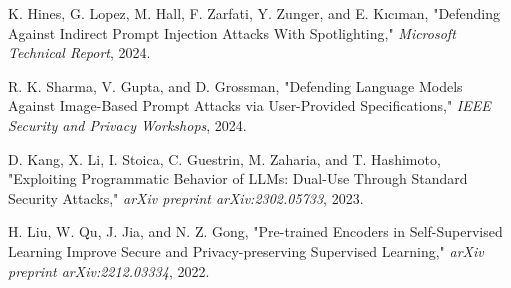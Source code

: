 \documentclass[journal]{IEEEtran}  %
\begin{document}
\begin{thebibliography}{4}

 K. Hines, G. Lopez, M. Hall, F. Zarfati, Y. Zunger, and E. Kıcıman, "Defending Against Indirect Prompt Injection Attacks With Spotlighting," \emph{Microsoft Technical Report}, 2024.

 R. K. Sharma, V. Gupta, and D. Grossman, "Defending Language Models Against Image-Based Prompt Attacks via User-Provided Specifications," \emph{IEEE Security and Privacy Workshops}, 2024.

 D. Kang, X. Li, I. Stoica, C. Guestrin, M. Zaharia, and T. Hashimoto, "Exploiting Programmatic Behavior of LLMs: Dual-Use Through Standard Security Attacks," \emph{arXiv preprint arXiv:2302.05733}, 2023.

 H. Liu, W. Qu, J. Jia, and N. Z. Gong, "Pre-trained Encoders in Self-Supervised Learning Improve Secure and Privacy-preserving Supervised Learning," \emph{arXiv preprint arXiv:2212.03334}, 2022.

\end{thebibliography}
\end{document}
